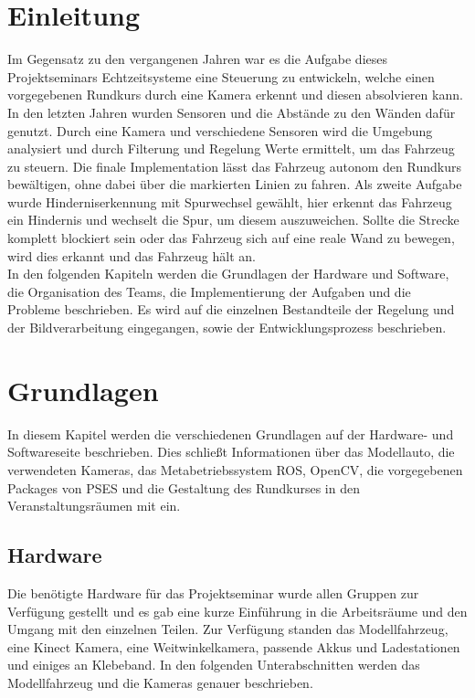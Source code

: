 \section{Einleitung}
\label{cha:einleitung}
Im Gegensatz zu den vergangenen Jahren war es die Aufgabe dieses Projektseminars Echtzeitsysteme eine Steuerung zu entwickeln, welche einen vorgegebenen Rundkurs durch eine Kamera erkennt und diesen absolvieren kann. In den letzten Jahren wurden Sensoren und die Abstände zu den Wänden dafür genutzt. Durch eine Kamera und verschiedene Sensoren wird die Umgebung analysiert und durch Filterung und Regelung Werte ermittelt, um das Fahrzeug zu steuern. 
Die finale Implementation lässt das Fahrzeug autonom den Rundkurs bewältigen, ohne dabei über die markierten Linien zu fahren. Als zweite Aufgabe wurde Hinderniserkennung mit Spurwechsel gewählt, hier erkennt das Fahrzeug ein Hindernis und wechselt die Spur, um diesem auszuweichen. Sollte die Strecke komplett blockiert sein oder das Fahrzeug sich auf eine reale Wand zu bewegen, wird dies erkannt und das Fahrzeug hält an. \\
In den folgenden Kapiteln werden die Grundlagen der Hardware und Software, die Organisation des Teams, die Implementierung der Aufgaben und die Probleme beschrieben. Es wird auf die einzelnen Bestandteile der Regelung und der Bildverarbeitung eingegangen, sowie der Entwicklungsprozess beschrieben. 

\clearpage
\section{Grundlagen}
\label{cha:grundlagen}
In diesem Kapitel werden die verschiedenen Grundlagen auf der Hardware- und Softwareseite beschrieben. Dies schließt Informationen über das Modellauto, die verwendeten Kameras, das Metabetriebssystem ROS, OpenCV, die vorgegebenen Packages von PSES und die Gestaltung des Rundkurses in den Veranstaltungsräumen mit ein.

\subsection{Hardware}
\label{sec:hardware}
Die benötigte Hardware für das Projektseminar wurde allen Gruppen zur Verfügung gestellt und es gab eine kurze Einführung in die Arbeitsräume und den Umgang mit den einzelnen Teilen. Zur Verfügung standen das Modellfahrzeug, eine Kinect Kamera, eine Weitwinkelkamera, passende Akkus und Ladestationen und einiges an Klebeband. In den folgenden Unterabschnitten werden das Modellfahrzeug und die Kameras genauer beschrieben. 
